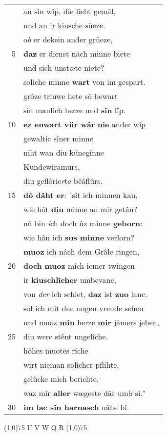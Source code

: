 \documentclass[8pt,a4paper,notitlepage]{article}
\begin{document}
\begin{table}[ht]
\begin{minipage}[t]{0.5\linewidth}
\begin{tabular}{rl}
 & an sîn wîp, die lieht gemâl,\\ 
 & und an ir kiusche süeze.\\ 
 & o\textit{b} er dekein ander grüeze,\\ 
5 & \textbf{daz} er dienst nâch minne biete\\ 
 & und sich unstæte niete?\\ 
 & soliche minne \textbf{wart} von im gespart.\\ 
 & grôze triuwe hete sô bewart\\ 
 & sîn manlîch herze und \textbf{sîn} lîp.\\ 
10 & \textbf{ez enwart vür wâr} \textbf{nie} ander wîp\\ 
 & gewaltic sîner minne\\ 
 & niht wan diu küneginne\\ 
 & Kundewiramurs,\\ 
 & diu geflôrie\textit{r}te bêâflûrs.\\ 
15 & \textbf{dô dâht er}: "sît ich minnen kan,\\ 
 & wie hât \textbf{diu} minne an mir getân?\\ 
 & nû bin \textit{i}ch doch ûz minne \textbf{geborn}:\\ 
 & wie hân ich \textbf{sus minne} verlorn?\\ 
 & \textbf{muoz} ich nâch dem Grâle ringen,\\ 
20 & \textbf{doch} \textbf{muoz} mich iemer twingen\\ 
 & ir \textbf{kiuschlîcher} umbevanc,\\ 
 & von \textit{der} ich schiet, \textbf{daz} ist \textbf{zuo} lanc.\\ 
 & sol ich mit den ougen vreude sehen\\ 
 & und muoz \textbf{mîn} herze \textbf{mir} jâmers jehen,\\ 
25 & diu werc stênt ungelîche.\\ 
 & hôhes muotes rîche\\ 
 & wirt nieman solicher pflihte.\\ 
 & gelücke mich berichte,\\ 
 & waz mir \textbf{aller} wægeste dâr umb sî."\\ 
30 & \textbf{im lac sîn harnasch} nâhe bî.\\ 
\end{tabular}
\scriptsize
\line(1,0){75} \newline
U V W Q R \newline
\line(1,0){75} \newline

\end{minipage}
\end{table}
\end{document}
